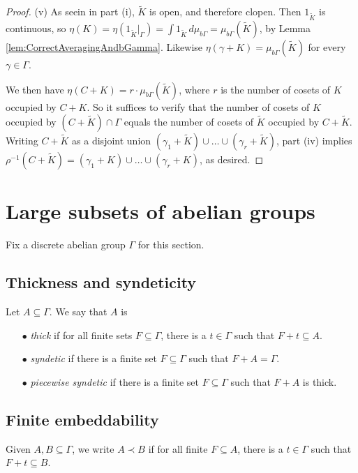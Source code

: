 \documentclass[12pt]{amsart} \usepackage{amsmath,centernot,amssymb,leftindex}
\numberwithin{theorem}{section}
\numberwithin{equation}{section}
\theoremstyle{definition}
\begin{document}
\begin{proof}
(v)  As seein in part (i), $\tilde{K}$ is open, and therefore clopen. Then $1_{\tilde{K}}$ is continuous, so $\eta(K)=\eta(1_{\tilde{K}}|_{\Gamma})=\int 1_{\tilde{K}}\, d\mu_{b\Gamma}=\mu_{b\Gamma}(\tilde{K})$, by Lemma \ref{lem:CorrectAveragingAndbGamma}. Likewise $\eta(\gamma+K)=\mu_{b\Gamma}(\tilde{K})$ for every $\gamma\in \Gamma$.

We then have $\eta(C+K)=r\cdot \mu_{b\Gamma}(\tilde{K})$, where $r$ is the number of cosets of $K$ occupied by $C+K$. So it suffices to verify that the number of cosets of $K$ occupied by $(C+\tilde{K})\cap \Gamma$ equals the number of cosets of $\tilde{K}$ occupied by $C+\tilde{K}$.  Writing $C+\tilde{K}$ as a disjoint union $(\gamma_{1}+\tilde{K})\cup \dots \cup (\gamma_{r}+\tilde{K})$, part (iv) implies $\rho^{-1}(C+\tilde{K})=(\gamma_{1}+K)\cup \dots \cup (\gamma_{r}+K)$, as desired. \end{proof}
	



	
	\section{Large subsets of abelian groups}\label{sec:LargeSubsets}
Fix a discrete abelian group $\Gamma$ for this section.
	
	\subsection{Thickness and syndeticity}
	Let $A\subseteq \Gamma$.  We say that $A$ is 
\begin{enumerate}
		\item[$\bullet$] \emph{thick} if for all finite sets $F\subseteq \Gamma$, there is a $t\in \Gamma$ such that $F+t\subseteq A$.
		
		\item[$\bullet$] \emph{syndetic} if there is a finite set $F\subseteq \Gamma$ such that $F+A=\Gamma$.  
		
		\item[$\bullet$] \emph{piecewise syndetic} if there is a finite set $F\subseteq \Gamma$ such that $F+A$ is thick.
	\end{enumerate}
	
	
	\subsection{
		Finite embeddability} Given $A,B\subseteq \Gamma$, we write $A\prec B$ if for all finite $F\subseteq A$, there is a $t\in \Gamma$ such that $F+t\subseteq B$.
\end{document}
